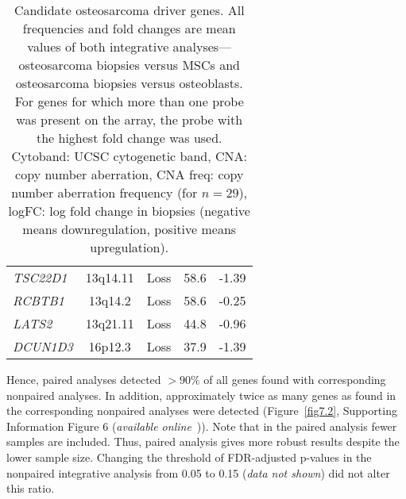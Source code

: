 \begin{table}[htbp]
\begin{tabular}[c]{|lcccc|}
		{\it TSC22D1} & 13q14.11 & Loss & 58.6 & -1.39\\
		{\it RCBTB1} & 13q14.2 & Loss & 58.6 & -0.25\\
		{\it LATS2} & 13q21.11 & Loss & 44.8 & -0.96\\
		{\it DCUN1D3} & 16p12.3 & Loss & 37.9 & -1.39\\
		\hline
		\end{tabular}
\caption{Candidate osteosarcoma driver genes. All frequencies and fold changes are mean values of both integrative analyses---osteosarcoma biopsies versus MSCs and osteosarcoma biopsies versus osteoblasts. For genes for which more than one probe was present on the array, the probe with the highest fold change was used. Cytoband: UCSC cytogenetic band, CNA: copy number aberration, CNA freq: copy number aberration frequency (for $n=29$), logFC: log fold change in biopsies (negative means downregulation, positive means upregulation).}
	\label{tab7.2}
\end{table}
%
Hence, paired analyses
detected $>90\%$ of all genes found with corresponding
nonpaired analyses. In addition, approximately
twice as many genes as found in the
corresponding nonpaired analyses were detected
(Figure~\ref{fig7.2}, Supporting Information Figure 6 ({\it available online}~\cite{ch7additional})). Note that
in the paired analysis fewer samples are included.
Thus, paired analysis gives more robust results
despite the lower sample size. Changing the
threshold of FDR\hyp{}adjusted p-values in the nonpaired
integrative analysis from 0.05 to 0.15 ({\it data
not shown}) did not alter this ratio.

